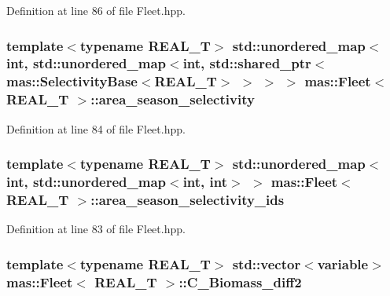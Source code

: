 Definition at line 86 of file Fleet.\-hpp.

\hypertarget{structmas_1_1_fleet_a0cf9a3f0c5ae179699c1264a7583db56}{
\subsubsection[{area\-\_\-season\-\_\-selectivity}]{\setlength{\rightskip}{0pt plus 5cm}template$<$typename R\-E\-A\-L\-\_\-\-T$>$ std\-::unordered\-\_\-map$<$int, std\-::unordered\-\_\-map$<$int, std\-::shared\-\_\-ptr$<${\bf mas\-::\-Selectivity\-Base}$<$R\-E\-A\-L\-\_\-\-T$>$ $>$ $>$ $>$ {\bf mas\-::\-Fleet}$<$ R\-E\-A\-L\-\_\-\-T $>$\-::area\-\_\-season\-\_\-selectivity}}\label{structmas_1_1_fleet_a0cf9a3f0c5ae179699c1264a7583db56}


Definition at line 84 of file Fleet.\-hpp.

\hypertarget{structmas_1_1_fleet_ac13bc4011086cb3fc3b6838d02885db5}{
\subsubsection[{area\-\_\-season\-\_\-selectivity\-\_\-ids}]{\setlength{\rightskip}{0pt plus 5cm}template$<$typename R\-E\-A\-L\-\_\-\-T$>$ std\-::unordered\-\_\-map$<$int, std\-::unordered\-\_\-map$<$int, int$>$ $>$ {\bf mas\-::\-Fleet}$<$ R\-E\-A\-L\-\_\-\-T $>$\-::area\-\_\-season\-\_\-selectivity\-\_\-ids}}\label{structmas_1_1_fleet_ac13bc4011086cb3fc3b6838d02885db5}


Definition at line 83 of file Fleet.\-hpp.

\hypertarget{structmas_1_1_fleet_a9851fff6a635dce825730a1218361b35}{
\subsubsection[{C\-\_\-\-Biomass\-\_\-diff2}]{\setlength{\rightskip}{0pt plus 5cm}template$<$typename R\-E\-A\-L\-\_\-\-T$>$ std\-::vector$<${\bf variable}$>$ {\bf mas\-::\-Fleet}$<$ R\-E\-A\-L\-\_\-\-T $>$\-::C\-\_\-\-Biomass\-\_\-diff2}}\label{structmas_1_1_fleet_a9851fff6a635dce825730a1218361b35}


